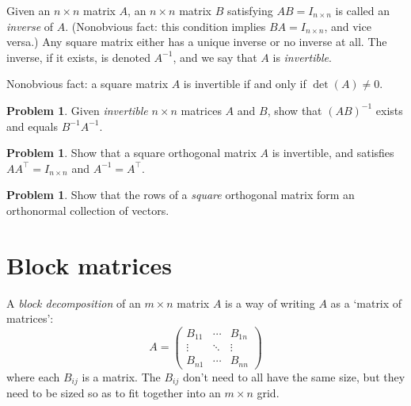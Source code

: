 \documentclass[10pt]{amsart}
\theoremstyle{mythm}
\theoremstyle{definition}
\newtheorem{prob}[thm]{Problem}
\theoremstyle{myrmk}
\begin{document}
	Given an $n \times n$ matrix $A$, an $n \times n$ matrix $B$ satisfying $AB = I_{n \times n}$ is called an \emph{inverse} of $A$. (Nonobvious fact: this condition implies $BA=I_{n \times n}$, and vice versa.) Any square matrix either has a unique inverse or no inverse at all. The inverse, if it exists, is denoted $A^{-1}$, and we say that $A$ is \emph{invertible}. 
	
	Nonobvious fact: a square matrix $A$ is invertible if and only if $\det(A) \neq 0$. 
	
	\begin{prob}
		Given \emph{invertible} $n \times n$ matrices $A$ and $B$, show that $(AB)^{-1}$ exists and equals $B^{-1}A^{-1}$. 
	\end{prob}
	
	\begin{prob}
		Show that a square orthogonal matrix $A$ is invertible, and satisfies $AA^{\top} = I_{n\times n}$ and $A^{-1} = A^{\top}$.  
	\end{prob}
	
	\begin{prob}
		Show that the rows of a \emph{square} orthogonal matrix form an orthonormal collection of vectors. 
	\end{prob}
	
	\section{Block matrices} 
	
	A \emph{block decomposition} of an $m \times n$ matrix $A$ is a way of writing $A$ as a `matrix of matrices': 
	\[
		A = \begin{pmatrix}
			B_{11} & \cdots & B_{1n} \\
			\vdots & \ddots & \vdots \\
			B_{n1} & \cdots & B_{nn} 
		\end{pmatrix}    
	\]
	where each $B_{ij}$ is a matrix. The $B_{ij}$ don't need to all have the same size, but they need to be sized so as to fit together into an $m \times n$ grid. 
	
\end{document}

